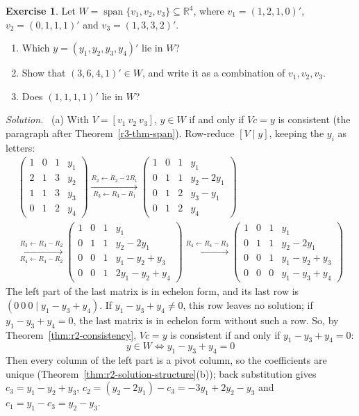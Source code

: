 \documentclass[12pt]{article}
\newcommand{\R}{\mathbb R}
\DeclareMathOperator{\Span}{span}
\theoremstyle{definition}
\newtheorem{exercise}{Exercise}
\newenvironment{solution}{\par\noindent\textit{Solution.}\ }{\par\smallskip}
\begin{document}
\begin{exercise}\label{r3-ex-span-drill}
Let \(W=\Span\{v_1,v_2,v_3\}\subseteq\R^4\), where \(v_1=(1,2,1,0)'\), \(v_2=(0,1,1,1)'\) and
\(v_3=(1,3,3,2)'\).
\begin{enumerate}
\item Which \(y=(y_1,y_2,y_3,y_4)'\) lie in \(W\)?
\item Show that \((3,6,4,1)'\in W\), and write it as a combination of \(v_1,v_2,v_3\).
\item Does \((1,1,1,1)'\) lie in \(W\)?
\end{enumerate}
\end{exercise}
\begin{solution}
(a) With \(V=[v_1\ v_2\ v_3]\), \(y\in W\) if and only if \(Vc=y\) is consistent (the paragraph
after Theorem~\ref{r3-thm-span}). Row-reduce \([V\mid y]\), keeping the \(y_i\) as letters:
\[
\begin{gathered}
\left(\begin{array}{ccc|c}1&0&1&y_1\\2&1&3&y_2\\1&1&3&y_3\\0&1&2&y_4\end{array}\right)
\xrightarrow[R_3\leftarrow R_3-R_1]{R_2\leftarrow R_2-2R_1}
\left(\begin{array}{ccc|c}1&0&1&y_1\\0&1&1&y_2-2y_1\\0&1&2&y_3-y_1\\0&1&2&y_4\end{array}\right)
\\
\xrightarrow[R_4\leftarrow R_4-R_2]{R_3\leftarrow R_3-R_2}
\left(\begin{array}{ccc|c}1&0&1&y_1\\0&1&1&y_2-2y_1\\0&0&1&y_1-y_2+y_3\\0&0&1&2y_1-y_2+y_4\end{array}\right)
\xrightarrow{R_4\leftarrow R_4-R_3}
\left(\begin{array}{ccc|c}1&0&1&y_1\\0&1&1&y_2-2y_1\\0&0&1&y_1-y_2+y_3\\0&0&0&y_1-y_3+y_4\end{array}\right)
\end{gathered}
\]
The left part of the last matrix is in echelon form, and its last row is \((0\ 0\ 0\mid y_1-y_3+y_4)\). If
\(y_1-y_3+y_4\ne0\), this row leaves no solution; if \(y_1-y_3+y_4=0\), the last matrix is in echelon form without
such a row. So, by Theorem~\ref{thm:r2-consistency}, \(Vc=y\) is consistent if and only if \(y_1-y_3+y_4=0\):
\[
y\in W\iff y_1-y_3+y_4=0
\]
Then every column of the left part is a pivot column, so the coefficients are unique
(Theorem~\ref{thm:r2-solution-structure}(b)); back substitution gives \(c_3=y_1-y_2+y_3\),
\(c_2=(y_2-2y_1)-c_3=-3y_1+2y_2-y_3\) and \(c_1=y_1-c_3=y_2-y_3\).


\end{solution}
\end{document}
